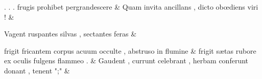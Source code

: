 \documentclass[12pt,onecolumn,twoside,a4paper]{memoir}
\begin{document}
               \begin{pairs}
                  \begin{Leftside}
			\beginnumbering
			\setcounter{stanzaL}{0}
                     
                         \stanza {}
                     .
                              .
                              .
                              frugis
                              prohibet
                              pergrandescere \&
                         \stanza {}
                     Quam
                              invita
                              ancillans
                              ,
                              dicto
                              obœdiens
                              viri
                              ! \&
                         \stanza {}
                     
                              Vagent
                              ruspantes
                              silvas
                              ,
                              sectantes
                              feras \&
                         \stanza {}
                     
                              frigit
                              fricantem
                              corpus
                              acuum
                              occulte
                              ,
                              abstruso
                              in
                              flumine \&
                         \stanza {}
                     frigit
                              sætas
                              rubore
                              ex
                              oculis
                              fulgens
                              flammeo
                              . \&
                         \stanza {}Gaudent
                              ,
                              currunt
                              celebrant
                              ,
                              herbam
                              conferunt
                              donant
                              ,
                              tenent
                              ";" & 
                     

\end{Leftside}
\end{pairs}
\end{document}
